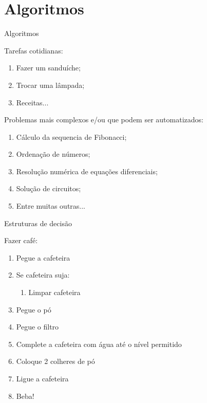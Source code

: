 \documentclass{beamer}
\begin{document}
\section{Algoritmos}
\begin{frame}{Algoritmos}
    
    \small 
    
    Tarefas cotidianas:

    \begin{enumerate}
        \item Fazer um sanduíche;
        \item Trocar uma lâmpada;
        \item Receitas...
    \end{enumerate}

    Problemas mais complexos e/ou que podem ser automatizados:

    \begin{enumerate}
        \item Cálculo da sequencia de Fibonacci;
        \item Ordenação de números;
        \item Resolução numérica de equações diferenciais;
        \item Solução de circuitos;
        \item Entre muitas outras...
    \end{enumerate} 
\end{frame}

\begin{frame}{Estruturas de decisão}
    
    \small

    Fazer café:

    \begin{enumerate}
        \item Pegue a cafeteira
        \item Se cafeteira suja:
        \begin{enumerate}
            \item Limpar cafeteira
        \end{enumerate}
        \item Pegue o pó
        \item Pegue o filtro
        \item Complete a cafeteira com água até o nível permitido
        \item Coloque 2 colheres de pó
        \item Ligue a cafeteira
        \item Beba!
    \end{enumerate}
\end{frame}
\end{document}
